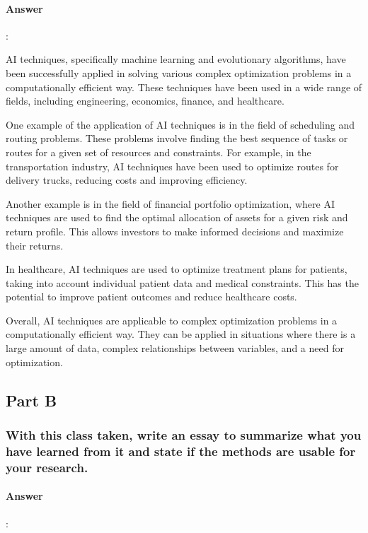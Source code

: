\documentclass{article}
\begin{document}
\paragraph{Answer}:


AI techniques, specifically machine learning and evolutionary algorithms, have been successfully applied in solving various complex optimization problems in a computationally efficient way. These techniques have been used in a wide range of fields, including engineering, economics, finance, and healthcare.

One example of the application of AI techniques is in the field of scheduling and routing problems. These problems involve finding the best sequence of tasks or routes for a given set of resources and constraints. For example, in the transportation industry, AI techniques have been used to optimize routes for delivery trucks, reducing costs and improving efficiency.

Another example is in the field of financial portfolio optimization, where AI techniques are used to find the optimal allocation of assets for a given risk and return profile. This allows investors to make informed decisions and maximize their returns.

In healthcare, AI techniques are used to optimize treatment plans for patients, taking into account individual patient data and medical constraints. This has the potential to improve patient outcomes and reduce healthcare costs.

Overall, AI techniques are applicable to complex optimization problems in a computationally efficient way. They can be applied in situations where there is a large amount of data, complex relationships between variables, and a need for optimization.

\subsection{Part B}

\subsubsection{With this class taken, write an essay to summarize what you have learned from it and state if the methods are usable for your research.}

\paragraph{Answer}:
\end{document}

